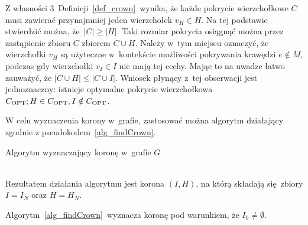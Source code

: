 \begin{bproof}
  Z własności 3\ Definicji~\ref{def_crown}\ wynika, że każde pokrycie wierzchołkowe $C$ musi zawierać przynajmniej jeden wierzchołek $v_H \in H$.
  Na tej podstawie stwierdzić można, że $|C|\geq|H|$.
  Taki rozmiar pokrycia osiągnąć można przez zastąpienie zbioru $C$ zbiorem $C\cup H$.
  Należy w~tym miejscu oznaczyć, że wierzchołki $v_H$ są użyteczne w~kontekście możliwości pokrywania krawędzi $e \notin M$, podczas gdy wierzchołki $v_I \in
  I$ nie mają tej cechy.
  Mając to na uwadze łatwo zauważyć, że $|C \cup H| \leq |C \cup I|$.
  Wniosek płynący z~tej obserwacji jest jednoznaczny: istnieje optymalne pokrycie wierzchołkowa $C_{\textnormal{OPT}}; H \in C_{\textnormal{OPT}}, I \notin C_{\textnormal{OPT}}$.
\end{bproof}
W celu wyznaczenia korony w~grafie, zastosować można algorytm działający zgodnie z pseudokodem~\ref{alg_findCrown}.
\begin{algorithm}
  \caption{Algorytm wyznaczający koronę w~grafie $G$}\label{alg_findCrown}
  \begin{algorithmic}[1]
     
    \State\textbf{return} nil
  \EndIf
   
  \State{\textbf{return} nil
\EndIf
\State{$I_0 \leftarrow v_O\in O, \neg\exists_{e_{M_2}=(u,v)\in M_2}: u=v_O\lor v=v_O$}
\State($n \leftarrow 1$)
\While{$I_{n-1} \neq I_n$}\label{findCrown_while}
\State{$H_n \leftarrow N(I_n)$}\label{findCrown_makeH}
\State{$I_{n+1} \leftarrow I_n\cup N_{M_2}(H_n)$}\label{findCrown_makeI}
\State{$n \leftarrow n+1$}
\EndWhile\label{findCrown_endWhile}
\State $N \gets n$
\State{\textbf{return} $(I_N,H_N)$}
  \EndFunction
\end{algorithmic}
\end{algorithm}\\
Rezultatem działania algorytmu jest korona $(I,H)$, na którą składają się zbiory $I=I_N$ oraz $H=H_N$.
\begin{theorem}
  Algorytm~\ref{alg_findCrown}\ wyznacza koronę pod warunkiem, że $I_0\neq\emptyset$.
\end{theorem}
